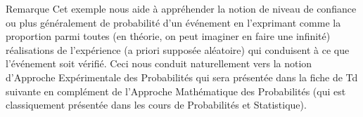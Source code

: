 \documentclass[10pt]{report}
\begin{document}
\begin{exercice}
\begin{enumerate}
\end{enumerate}

\begin{Indication}{Remarque} Cet exemple nous aide à appréhender la notion de niveau de confiance ou plus généralement de probabilité d'un événement en l'exprimant comme la proportion parmi toutes (en théorie, on peut imaginer en faire une infinité) réalisations de l'expérience (a priori supposée aléatoire) qui conduisent à ce que l'événement soit vérifié. Ceci nous conduit naturellement vers la notion d'Approche Expérimentale des Probabilités qui sera présentée dans la fiche de Td suivante en complément de l'Approche Mathématique des Probabilités (qui est classiquement présentée dans les cours de Probabilités et Statistique).
\end{Indication}

\end{exercice}
\end{document}
